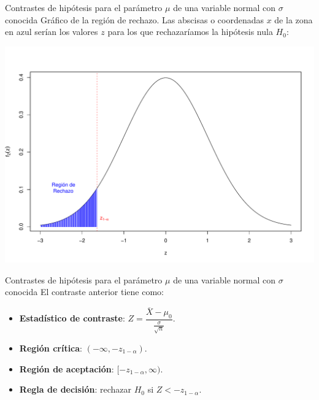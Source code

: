 \documentclass[
  ignorenonframetext,
]{beamer}
\begin{document}
\begin{frame}{Contrastes de hipótesis para el parámetro \(\mu\) de una
variable normal con \(\sigma\) conocida}
\protect\hypertarget{contrastes-de-hipuxf3tesis-para-el-paruxe1metro-mu-de-una-variable-normal-con-sigma-conocida-9}{}
Gráfico de la región de rechazo. Las abscisas o coordenadas \(x\) de la
zona en azul serían los valores \(z\) para los que rechazaríamos la
hipótesis nula \(H_0\):

\begin{center}\includegraphics{contrastes_dos_muestras_files/figure-beamer/unnamed-chunk-2-1} \end{center}
\end{frame}

\begin{frame}{Contrastes de hipótesis para el parámetro \(\mu\) de una
variable normal con \(\sigma\) conocida}
\protect\hypertarget{contrastes-de-hipuxf3tesis-para-el-paruxe1metro-mu-de-una-variable-normal-con-sigma-conocida-10}{}
El contraste anterior tiene como:

\begin{itemize}[<+->]
\item
  \textbf{Estadístico de contraste}:
  \(Z=\dfrac{\overline{X}-\mu_0}{\frac{\sigma}{\sqrt{n}}}\).
\item
  \textbf{Región crítica}: \((-\infty,-z_{1-\alpha})\).
\item
  \textbf{Región de aceptación}: \([-z_{1-\alpha},\infty)\).
\item
  \textbf{Regla de decisión}: rechazar \(H_0\) si \(Z < -z_{1-\alpha}\).
\end{itemize}
\end{frame}
\end{document}
